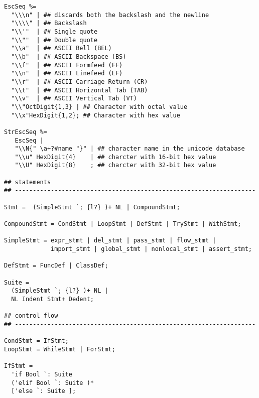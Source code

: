 \documentclass{article}
\begin{document}
\begin{verbatim}
EscSeq %=
  "\\\n" | ## discards both the backslash and the newline
  "\\\\" | ## Backslash 
  "\\'"  | ## Single quote 
  "\\""  | ## Double quote 
  "\\a"  | ## ASCII Bell (BEL)                  
  "\\b"  | ## ASCII Backspace (BS)              
  "\\f"  | ## ASCII Formfeed (FF)               
  "\\n"  | ## ASCII Linefeed (LF)               
  "\\r"  | ## ASCII Carriage Return (CR)        
  "\\t"  | ## ASCII Horizontal Tab (TAB)        
  "\\v"  | ## ASCII Vertical Tab (VT)           
  "\\"OctDigit{1,3} | ## Character with octal value
  "\\x"HexDigit{1,2}; ## Character with hex value 
   
StrEscSeq %=
   EscSeq |
   "\\N{" \a+?#name "}" | ## character name in the unicode database 
   "\\u" HexDigit{4}    | ## charcter with 16-bit hex value
   "\\U" HexDigit{8}    ; ## charcter with 32-bit hex value
   
## statements
## ----------------------------------------------------------------------
Stmt =  (SimpleStmt `; {l?} )+ NL | CompoundStmt; 
     
CompoundStmt = CondStmt | LoopStmt | DefStmt | TryStmt | WithStmt;
             
SimpleStmt = expr_stmt | del_stmt | pass_stmt | flow_stmt |
             import_stmt | global_stmt | nonlocal_stmt | assert_stmt;             
             
DefStmt = FuncDef | ClassDef;         
             
Suite =
  (SimpleStmt `; {l?} )+ NL |
  NL Indent Stmt+ Dedent;
        
## control flow
## ----------------------------------------------------------------------
CondStmt = IfStmt;
LoopStmt = WhileStmt | ForStmt;
        
IfStmt =
  'if Bool `: Suite
  ('elif Bool `: Suite )*
  ['else `: Suite ];
        

\end{verbatim}
\end{document}
